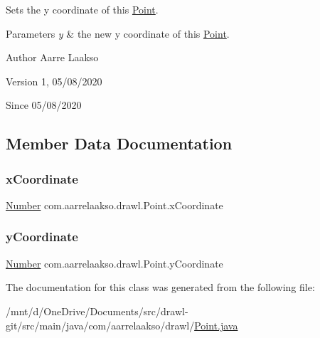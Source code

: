 Sets the y coordinate of this \hyperlink{classcom_1_1aarrelaakso_1_1drawl_1_1_point}{Point}. 


\begin{DoxyParams}{Parameters}
{\em y} & the new y coordinate of this \hyperlink{classcom_1_1aarrelaakso_1_1drawl_1_1_point}{Point}. \\
\hline
\end{DoxyParams}
\begin{DoxyAuthor}{Author}
Aarre Laakso 
\end{DoxyAuthor}
\begin{DoxyVersion}{Version}
1, 05/08/2020 
\end{DoxyVersion}
\begin{DoxySince}{Since}
05/08/2020 
\end{DoxySince}


\subsection{Member Data Documentation}
\mbox{\label{classcom_1_1aarrelaakso_1_1drawl_1_1_point_aa5144c5cca82c86f845bead6d4a51041}} 
\subsubsection{\texorpdfstring{x\+Coordinate}{xCoordinate}}
{\footnotesize\ttfamily \hyperlink{interfacecom_1_1aarrelaakso_1_1drawl_1_1_number}{Number} com.\+aarrelaakso.\+drawl.\+Point.\+x\+Coordinate\hspace{0.3cm}{\ttfamily [private]}}

\mbox{\label{classcom_1_1aarrelaakso_1_1drawl_1_1_point_ab84afea50a66677c32ed2fd3100838c7}} 
\subsubsection{\texorpdfstring{y\+Coordinate}{yCoordinate}}
{\footnotesize\ttfamily \hyperlink{interfacecom_1_1aarrelaakso_1_1drawl_1_1_number}{Number} com.\+aarrelaakso.\+drawl.\+Point.\+y\+Coordinate\hspace{0.3cm}{\ttfamily [private]}}



The documentation for this class was generated from the following file\+:\begin{DoxyCompactItemize}
\item 
/mnt/d/\+One\+Drive/\+Documents/src/drawl-\/git/src/main/java/com/aarrelaakso/drawl/\hyperlink{_point_8java}{Point.\+java}\end{DoxyCompactItemize}
